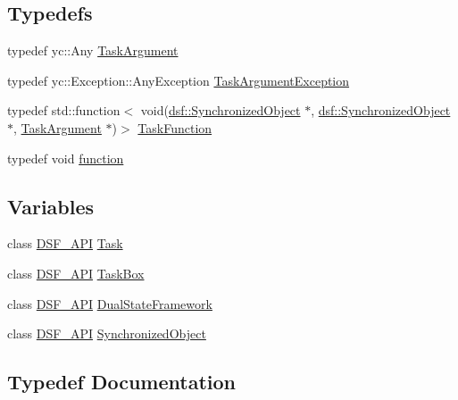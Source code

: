 \subsection*{Typedefs}
\begin{DoxyCompactItemize}
\item 
typedef yc\+::\+Any \hyperlink{namespacedsf_abe4bf68433935a81c31a5ada9b17663a}{Task\+Argument}
\item 
typedef yc\+::\+Exception\+::\+Any\+Exception \hyperlink{namespacedsf_af54027177bbfc0037be408a612d48b83}{Task\+Argument\+Exception}
\item 
typedef std\+::function$<$ void(\hyperlink{classdsf_1_1_synchronized_object}{dsf\+::\+Synchronized\+Object} $\ast$, \hyperlink{classdsf_1_1_synchronized_object}{dsf\+::\+Synchronized\+Object} $\ast$, \hyperlink{namespacedsf_abe4bf68433935a81c31a5ada9b17663a}{Task\+Argument} $\ast$)$>$ \hyperlink{namespacedsf_aa16e735f29587f4485b56fc46746f7a9}{Task\+Function}
\item 
typedef void \hyperlink{namespacedsf_a3ad20407a44eaf5ce4cf784a60c1b92b}{function}
\end{DoxyCompactItemize}
\subsection*{Variables}
\begin{DoxyCompactItemize}
\item 
class \hyperlink{_export_8h_ad7bb940831423512f29a6981786c37bd}{D\+S\+F\+\_\+\+A\+P\+I} \hyperlink{namespacedsf_a7df24c7d3d82e2e686aa3a524dc1dee9}{Task}
\item 
class \hyperlink{_export_8h_ad7bb940831423512f29a6981786c37bd}{D\+S\+F\+\_\+\+A\+P\+I} \hyperlink{namespacedsf_ac3c92e2a98380dd728b0c18d0c495966}{Task\+Box}
\item 
class \hyperlink{_export_8h_ad7bb940831423512f29a6981786c37bd}{D\+S\+F\+\_\+\+A\+P\+I} \hyperlink{namespacedsf_a68ac3b6a0526bfa7f6a412918afb1841}{Dual\+State\+Framework}
\item 
class \hyperlink{_export_8h_ad7bb940831423512f29a6981786c37bd}{D\+S\+F\+\_\+\+A\+P\+I} \hyperlink{namespacedsf_acbf1798fc56cfb1707162a17e13f5fda}{Synchronized\+Object}
\end{DoxyCompactItemize}


\subsection{Typedef Documentation}
\hypertarget{namespacedsf_a3ad20407a44eaf5ce4cf784a60c1b92b}{}
